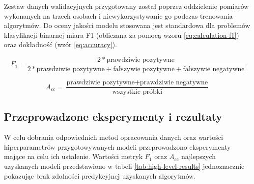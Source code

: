 \documentclass{./assets/wfis}
\begin{document}
Zestaw danych walidacyjnych przygotowany został poprzez oddzielenie pomiarów wykonanych na trzech osobach i niewykorzystywanie go podczas trenowania algorytmów. Do oceny jakości modelu stosowana jest standardowa dla problemów klasyfikacji binarnej miara F1 (obliczana za pomocą wzoru \ref{eq:calculation-f1}) oraz dokładność (wzór \ref{eq:accuracy}).

\begin{equation}\label{eq:calculation-f1}
    F_1 = \frac{2*\text{prawdziwie pozytywne}}{2*\text{prawdziwie pozytywne}+\text{fałszywie pozytywne}+\text{fałszywie negatywne}}
\end{equation}

\begin{equation}\label{eq:accuracy}
    A_{cc} = \frac{\text{prawdziwie pozytywne} + \text{prawdziwie negatywne}}{\text{wszystkie próbki}}
\end{equation}

\subsection{Przeprowadzone eksperymenty i rezultaty}
W celu dobrania odpowiednich metod opracowania danych oraz wartości hiperparametrów przygotowywanych modeli przeprowadzono eksperymenty mające na celu ich ustalenie. Wartości metryk $F_1$ oraz $A_{cc}$ najlepszych uzyskanych modeli przedstawiono w tabeli \ref{tab:high-level-results} jednoznacznie pokazując brak zdolności predykcyjnej uzyskanych algorytmów.




\end{document}
